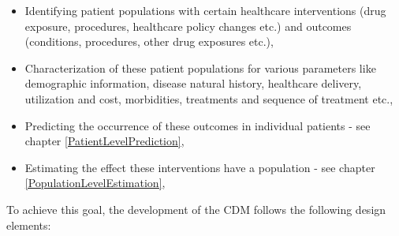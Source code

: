 \documentclass[11pt]{book}
\providecommand{\tightlist}{%
  \setlength{\itemsep}{0pt}\setlength{\parskip}{0pt}}
\theoremstyle{definition}
\theoremstyle{definition}
\theoremstyle{definition}
\theoremstyle{remark}
\begin{document}
\begin{itemize}
\tightlist
\item
  Identifying patient populations with certain healthcare interventions (drug exposure, procedures, healthcare policy changes etc.) and outcomes (conditions, procedures, other drug exposures etc.),
\item
  Characterization of these patient populations for various parameters like demographic information, disease natural history, healthcare delivery, utilization and cost, morbidities, treatments and sequence of treatment etc.,
\item
  Predicting the occurrence of these outcomes in individual patients - see chapter \ref{PatientLevelPrediction},
\item
  Estimating the effect these interventions have a population - see chapter \ref{PopulationLevelEstimation},
\end{itemize}

To achieve this goal, the development of the CDM follows the following design elements:
\end{document}
